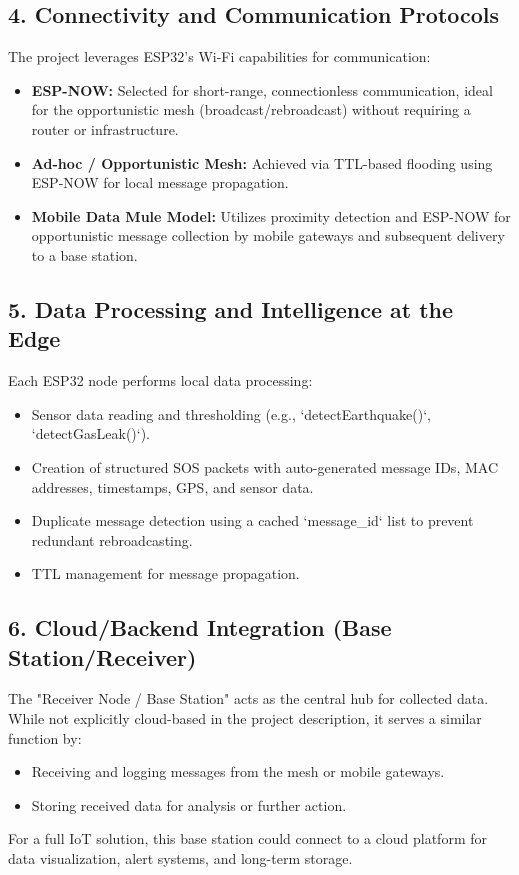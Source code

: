 \documentclass[12pt, a4paper]{article}
\begin{document}
\subsection{4. Connectivity and Communication Protocols}
The project leverages ESP32's Wi-Fi capabilities for communication:
\begin{itemize}
    \item \textbf{ESP-NOW:} Selected for short-range, connectionless communication, ideal for the opportunistic mesh (broadcast/rebroadcast) without requiring a router or infrastructure.
    \item \textbf{Ad-hoc / Opportunistic Mesh:} Achieved via TTL-based flooding using ESP-NOW for local message propagation.
    \item \textbf{Mobile Data Mule Model:} Utilizes proximity detection and ESP-NOW for opportunistic message collection by mobile gateways and subsequent delivery to a base station.
\end{itemize}

\subsection{5. Data Processing and Intelligence at the Edge}
Each ESP32 node performs local data processing:
\begin{itemize}
    \item Sensor data reading and thresholding (e.g., `detectEarthquake()`, `detectGasLeak()`).
    \item Creation of structured SOS packets with auto-generated message IDs, MAC addresses, timestamps, GPS, and sensor data.
    \item Duplicate message detection using a cached `message_id` list to prevent redundant rebroadcasting.
    \item TTL management for message propagation.
\end{itemize}

\subsection{6. Cloud/Backend Integration (Base Station/Receiver)}
The "Receiver Node / Base Station" acts as the central hub for collected data. While not explicitly cloud-based in the project description, it serves a similar function by:
\begin{itemize}
    \item Receiving and logging messages from the mesh or mobile gateways.
    \item Storing received data for analysis or further action.
\end{itemize}
For a full IoT solution, this base station could connect to a cloud platform for data visualization, alert systems, and long-term storage.
\end{document}
